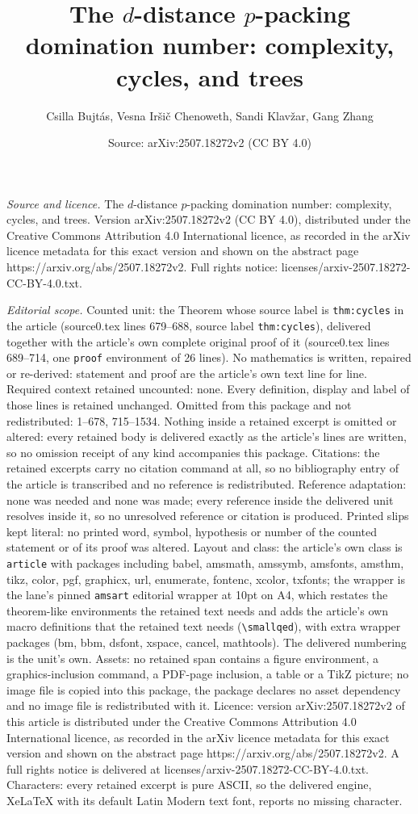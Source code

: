 \documentclass[10pt,a4paper]{amsart}
\title[The $d$-distance $p$-packing domination number: complexity, ]{The $d$-distance $p$-packing domination number: complexity, cycles, and trees}
\author{Csilla Bujt\'as, Vesna Ir\v{s}i\v{c} Chenoweth, Sandi Klav\v{z}ar, Gang Zhang}
\date{Source: arXiv:2507.18272v2 (CC BY 4.0)}
\begin{document}
\maketitle

\noindent\emph{Source and licence.} The $d$-distance $p$-packing domination number: complexity, cycles, and trees. Version arXiv:2507.18272v2 (CC BY 4.0), distributed under the Creative Commons Attribution 4.0 International licence, as recorded in the arXiv licence metadata for this exact version and shown on the abstract page https://arxiv.org/abs/2507.18272v2. Full rights notice: licenses/arxiv-2507.18272-CC-BY-4.0.txt.\par\smallskip

\noindent\textit{Editorial scope.} Counted unit: the Theorem whose source label is \texttt{thm:cycles} in the article (source0.tex lines 679--688, source label \texttt{thm:cycles}), delivered together with the article's own complete original proof of it (source0.tex lines 689--714, one \texttt{proof} environment of 26 lines). No mathematics is written, repaired or re-derived: statement and proof are the article's own text line for line. Required context retained uncounted: none. Every definition, display and label of those lines is retained unchanged. Omitted from this package and not redistributed: 1--678, 715--1534. Nothing inside a retained excerpt is omitted or altered: every retained body is delivered exactly as the article's lines are written, so no omission receipt of any kind accompanies this package. Citations: the retained excerpts carry no citation command at all, so no bibliography entry of the article is transcribed and no reference is redistributed. Reference adaptation: none was needed and none was made; every reference inside the delivered unit resolves inside it, so no unresolved reference or citation is produced. Printed slips kept literal: no printed word, symbol, hypothesis or number of the counted statement or of its proof was altered. Layout and class: the article's own class is \texttt{article} with packages including babel, amsmath, amssymb, amsfonts, amsthm, tikz, color, pgf, graphicx, url, enumerate, fontenc, xcolor, txfonts; the wrapper is the lane's pinned \texttt{amsart} editorial wrapper at 10pt on A4, which restates the theorem-like environments the retained text needs and adds the article's own macro definitions that the retained text needs (\texttt{\textbackslash smallqed}), with extra wrapper packages (bm, bbm, dsfont, xspace, cancel, mathtools). The delivered numbering is the unit's own. Assets: no retained span contains a figure environment, a graphics-inclusion command, a PDF-page inclusion, a table or a TikZ picture; no image file is copied into this package, the package declares no asset dependency and no image file is redistributed with it. Licence: version arXiv:2507.18272v2 of this article is distributed under the Creative Commons Attribution 4.0 International licence, as recorded in the arXiv licence metadata for this exact version and shown on the abstract page https://arxiv.org/abs/2507.18272v2. A full rights notice is delivered at licenses/arxiv-2507.18272-CC-BY-4.0.txt. Characters: every retained excerpt is pure ASCII, so the delivered engine, XeLaTeX with its default Latin Modern text font, reports no missing character.
\end{document}
